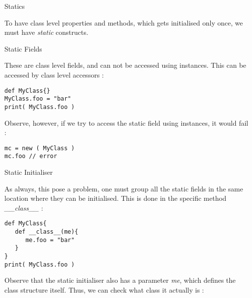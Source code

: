 \begin{section}{Statics}

To have class level properties and methods, which gets initialised only once,
we must have \emph{static} constructs.

\begin{subsection}{Static Fields}

These are class level fields, and can not be accessed using instances.
This can be accessed by class level accessors :

\begin{center}\begin{minipage}{\linewidth}
\begin{lstlisting}[style=JexlStyle]
def MyClass{}
MyClass.foo = "bar"
print( MyClass.foo )
\end{lstlisting}  
\end{minipage}\end{center}
Observe, however, if we try to access the static field using instances,
it would fail :
\begin{center}\begin{minipage}{\linewidth}
\begin{lstlisting}[style=JexlStyle]
mc = new ( MyClass ) 
mc.foo // error 
\end{lstlisting}  
\end{minipage}\end{center}

\end{subsection}

\begin{subsection}{Static Initialiser}

As always, this pose a problem, one must group all the static fields 
in the same location where they can be initialised. This is done in the 
specific method \emph{\_\_class\_\_} :

\begin{center}\begin{minipage}{\linewidth}
\begin{lstlisting}[style=JexlStyle]
def MyClass{
   def __class__(me){
      me.foo = "bar"
   }
}
print( MyClass.foo )
\end{lstlisting}  
\end{minipage}\end{center}
Observe that the static initialiser also has a parameter \emph{me},
which defines the class structure itself. Thus, we can check what class 
it actually is :


\end{subsection}
\end{section}
